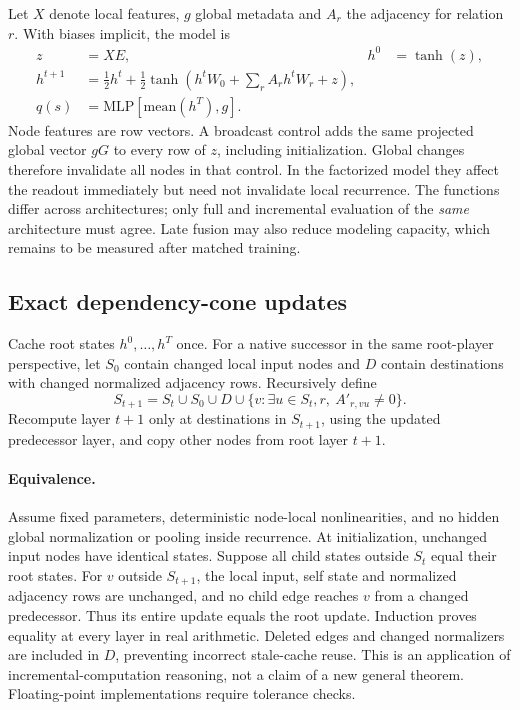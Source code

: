 \documentclass{article}
\begin{document}
Let $X$ denote local features, $g$ global metadata and $A_r$ the adjacency
for relation $r$. With biases implicit, the model is
\begin{align}
 z &= X E, & h^0 &= \tanh(z),\\
 h^{t+1} &= \tfrac12 h^t + \tfrac12\tanh\!\left(h^tW_0+
                   \sum_r A_rh^tW_r+z\right),\\
 q(s) &= \mathrm{MLP}\left[\mathrm{mean}(h^T),g\right].
\end{align}
Node features are row vectors. A broadcast control
adds the same projected global vector $gG$ to every row of $z$, including initialization. Global changes
therefore invalidate all nodes in that control. In the factorized model they
affect the readout immediately but need not invalidate local recurrence.
The functions differ across architectures; only full and incremental evaluation
of the \emph{same} architecture must agree. Late fusion may also reduce modeling
capacity, which remains to be measured after matched training.

\subsection{Exact dependency-cone updates}
Cache root states $h^0,\ldots,h^T$ once. For a native successor in the same
root-player perspective, let $S_0$ contain changed local input nodes and $D$
contain destinations with changed normalized adjacency rows. Recursively define
\begin{equation}
 S_{t+1}=S_t\cup S_0\cup D\cup\{v: \exists u\in S_t,r,\ A'_{r,vu}\ne0\}.
\end{equation}
Recompute layer $t+1$ only at destinations in $S_{t+1}$, using the updated
predecessor layer, and copy other nodes from root layer $t+1$.

\paragraph{Equivalence.}
Assume fixed parameters, deterministic node-local nonlinearities, and no hidden
global normalization or pooling inside recurrence. At initialization, unchanged
input nodes have identical states. Suppose all child states outside $S_t$ equal
their root states. For $v$ outside $S_{t+1}$, the local input, self state and
normalized adjacency rows are unchanged, and no child edge reaches $v$ from a
changed predecessor. Thus its entire update equals the root update. Induction
proves equality at every layer in real arithmetic. Deleted edges and changed
normalizers are included in $D$, preventing incorrect stale-cache reuse.
This is an application of incremental-computation reasoning, not a claim of a
new general theorem. Floating-point implementations require tolerance checks.
\end{document}
